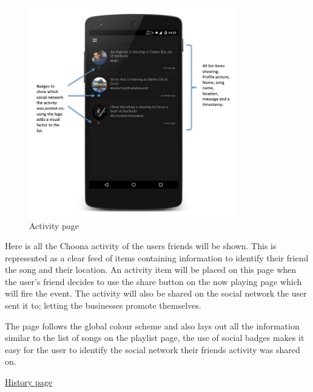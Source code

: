 \noindent
\begin{figure}[h!]
\centering
\includegraphics[width=0.8\textwidth]{./img/activityannotated.png}
\caption{Activity page}
\label{fig:activitypage}
\end{figure}

Here is all the Choona activity of the users friends will be shown. This is represented as a clear feed of items containing information to identify their friend the song and their location. An activity item will be placed on this page when the user's friend decides to use the share button on the now playing page which will fire the event. The activity will also be shared on the social network the user sent it to; letting the businesses promote themselves. 

The page follows the global colour scheme and also lays out all the information similar to the list of songs on the playlist page, the use of social badges makes it easy for the user to identify the social network their friends activity was shared on. 
\clearpage

\noindent\underline{History page}\newline

